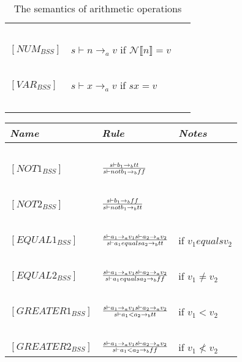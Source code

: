\begin{table}[h]
\begin{tabular}{|l|l|l|}
			~			&															~																			& ~ \\
	$[NUM_{BSS}]$		& $s \vdash n \rightarrow_{a} v$  if  $\mathcal{N}\llbracket n \rrbracket = v$															& ~ \\
			~			&															~																			& ~ \\
	$[VAR_{BSS}]$		& $s \vdash x \rightarrow_{a} v$  if  $sx = v$														   									& ~ \\
			~			&															~																			& ~ \\
	\hline
	\end{tabular}
	\label{tab:semantics_aritmethic}
	\caption{The semantics of arithmetic operations}
\end{table}

\begin{table}[h]
	\begin{tabular}{|l|l|l|}
	\hline
	\emph{Name}			& \emph{Rule}																															& \emph{Notes} \\ \hline
			~			&															~																			& ~ \\
	$[NOT1_{BSS}]$		& $s \vdash b_{1} \rightarrow_{b} tt \over s \vdash not b_{1} \rightarrow_{b} ff$														& ~ \\
			~			&															~																			& ~ \\
	$[NOT2_{BSS}]$		& $s \vdash b_{1} \rightarrow_{b} ff \over s \vdash not b_{1} \rightarrow_{b} tt$														& ~ \\
			~			&															~																			& ~ \\
	$[EQUAL1_{BSS}]$	& $s \vdash a_{1} \rightarrow_{a} v_{1}  s \vdash a_{2} \rightarrow_{a} v_{2} \over s \vdash a_{1} equals a_{2} \rightarrow_{b} tt$		& if $v_{1} equals v_{2}$ \\
			~			&															~																			& ~ \\
	$[EQUAL2_{BSS}]$	& $s \vdash a_{1} \rightarrow_{a} v_{1}  s \vdash a_{2} \rightarrow_{a} v_{2} \over s \vdash a_{1} equals a_{2} \rightarrow_{b} ff$		& if $v_{1} \ne v_{2}$ \\
			~			&															~																			& ~ \\
	$[GREATER1_{BSS}]$	& $s \vdash a_{1} \rightarrow_{a} v_{1}  s \vdash a_{2} \rightarrow_{a} v_{2} \over s \vdash a_{1} < a_{2} \rightarrow_{b} tt$			& if $v_{1} < v_{2}$ \\
			~			&															~																			& ~ \\
	$[GREATER2_{BSS}]$	& $s \vdash a_{1} \rightarrow_{a} v_{1}  s \vdash a_{2} \rightarrow_{a} v_{2} \over s \vdash a_{1} < a_{2} \rightarrow_{b} ff$			& if $v_{1} \not< v_{2}$ \\

\end{tabular}
\end{table}
